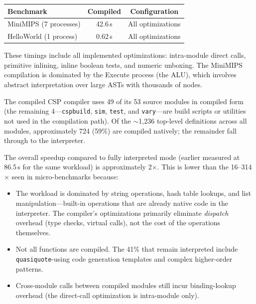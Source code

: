 \documentclass[12pt]{report}
\begin{document}
\begin{center}
\begin{tabular}{lcc}
\toprule
\textbf{Benchmark} & \textbf{Compiled} & \textbf{Configuration} \\
\midrule
MiniMIPS (7 processes) & 42.6\,s & All optimizations \\
HelloWorld (1 process) & 0.62\,s & All optimizations \\
\bottomrule
\end{tabular}
\end{center}

\noindent
These timings include all implemented optimizations: intra-module
direct calls, primitive inlining, inline boolean tests, and
numeric unboxing.  The MiniMIPS compilation is dominated by the
Execute process (the ALU), which involves abstract interpretation
over large ASTs with thousands of nodes.

The compiled CSP compiler uses 49 of its 53 source modules
in compiled form (the remaining 4---\texttt{cspbuild}, \texttt{sim},
\texttt{test}, and \texttt{vary}---are build scripts or utilities
not used in the compilation path).  Of the $\sim$1,236 top-level
definitions across all modules, approximately 724 (59\%) are
compiled natively; the remainder fall through to the interpreter.

The overall speedup compared to fully interpreted mode (earlier
measured at 86.5\,s for the same workload) is approximately
2$\times$.  This is lower than the 16--314$\times$ seen in
micro-benchmarks because:

\begin{itemize}
\item The workload is dominated by string operations, hash table
  lookups, and list manipulation---built-in operations that are
  already native code in the interpreter.  The compiler's
  optimizations primarily eliminate \emph{dispatch} overhead
  (type checks, virtual calls), not the cost of the operations
  themselves.

\item Not all functions are compiled.  The 41\% that remain
  interpreted include \texttt{quasiquote}-using code generation
  templates and complex higher-order patterns.

\item Cross-module calls between compiled modules still incur
  binding-lookup overhead (the direct-call optimization is
  intra-module only).
\end{itemize}
\end{document}
